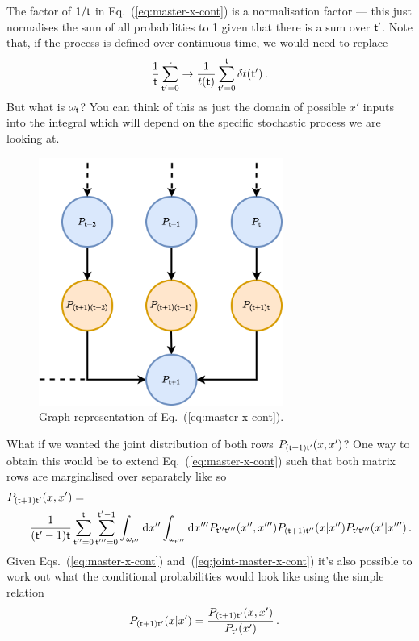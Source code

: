\documentclass{book}
\begin{document}
The factor of $1/{\sf t}$ in Eq.~(\ref{eq:master-x-cont}) is a normalisation factor --- this just normalises the sum of all probabilities to 1 given that there is a sum over ${\sf t}'$. Note that, if the process is defined over continuous time, we would need to replace 
\begin{align}
\frac{1}{{\sf t}}\sum_{{\sf t}'=0}^{{\sf t}} \rightarrow \frac{1}{t({\sf t})}\sum_{{\sf t}'=0}^{{\sf t}}\delta t({\sf t}') \,.
\end{align}
But what is $\omega_{\sf t}$? You can think of this as just the domain of possible $x'$ inputs into the integral which will depend on the specific stochastic process we are looking at.

\begin{figure}[h]
\centering
\includegraphics[width=8cm]{images/master-eq-graph.drawio.png}
\caption{Graph representation of Eq.~(\ref{eq:master-x-cont}).}
\label{fig:master-eqn}
\end{figure}

What if we wanted the joint distribution of both rows $P_{({\sf t}+1){\sf t}'}(x,x')$? One way to obtain this would be to extend Eq.~(\ref{eq:master-x-cont}) such that both matrix rows are marginalised over separately like so
\begin{align}
&P_{({\sf t}+1){\sf t}'}(x,x') = \nonumber \\
&\qquad \frac{1}{({\sf t}'-1){\sf t}}\sum_{{\sf t}''=0}^{{\sf t}}\sum_{{\sf t}'''=0}^{{\sf t}'-1}\int_{\omega_{{\sf t}''}}{\rm d}x''\int_{\omega_{{\sf t}'''}}{\rm d}x''' P_{{\sf t}''{\sf t}'''}(x'', x''') P_{({\sf t}+1){\sf t}''}(x\vert x'')P_{{\sf t}'{\sf t}'''}(x'\vert x''') \label{eq:joint-master-x-cont} \,.
\end{align}
Given Eqs.~(\ref{eq:master-x-cont}) and~(\ref{eq:joint-master-x-cont}) it's also possible to work out what the conditional probabilities would look like using the simple relation
\begin{align}
P_{({\sf t}+1){\sf t}'}(x\vert x') &= \frac{P_{({\sf t}+1){\sf t}'}(x,x')}{P_{{\sf t}'}(x')} \label{eq:cond-master-x-cont} \,.
\end{align}
\end{document}
